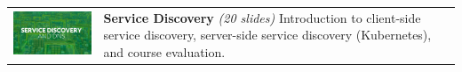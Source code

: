 \renewcommand*{\arraystretch}{2}
\begin{tabular}{p{6cm}p{7.5cm}}

\includegraphics[align=t,width=6cm]{figures/slides/slides_w7_service_discovery} & \textbf{Service Discovery} \newline \textit{(20 slides)} \newline Introduction to client-side service discovery, server-side service discovery (Kubernetes), and course evaluation.\\ 

\end{tabular}


